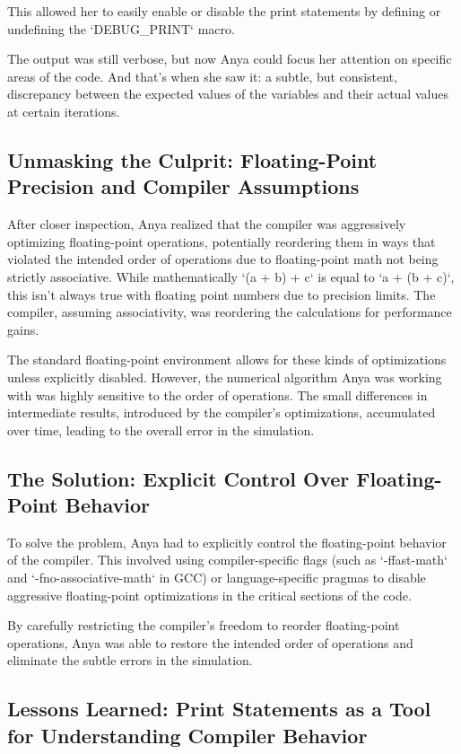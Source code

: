 \documentclass{article}
\begin{document}
{{{{This allowed her to easily enable or disable the print statements by defining or undefining the `DEBUG_PRINT` macro.

The output was still verbose, but now Anya could focus her attention on specific areas of the code. And that's when she saw it: a subtle, but consistent, discrepancy between the expected values of the variables and their actual values at certain iterations.

\subsection*{Unmasking the Culprit: Floating-Point Precision and Compiler Assumptions}

After closer inspection, Anya realized that the compiler was aggressively optimizing floating-point operations, potentially reordering them in ways that violated the intended order of operations due to floating-point math not being strictly associative. While mathematically `(a + b) + c` is equal to `a + (b + c)`, this isn't always true with floating point numbers due to precision limits. The compiler, assuming associativity, was reordering the calculations for performance gains.

The standard floating-point environment allows for these kinds of optimizations unless explicitly disabled. However, the numerical algorithm Anya was working with was highly sensitive to the order of operations. The small differences in intermediate results, introduced by the compiler's optimizations, accumulated over time, leading to the overall error in the simulation.

\subsection*{The Solution: Explicit Control Over Floating-Point Behavior}

To solve the problem, Anya had to explicitly control the floating-point behavior of the compiler. This involved using compiler-specific flags (such as `-ffast-math` and `-fno-associative-math` in GCC) or language-specific pragmas to disable aggressive floating-point optimizations in the critical sections of the code.

By carefully restricting the compiler's freedom to reorder floating-point operations, Anya was able to restore the intended order of operations and eliminate the subtle errors in the simulation.

\subsection*{Lessons Learned: Print Statements as a Tool for Understanding Compiler Behavior}

}}}}
\end{document}
